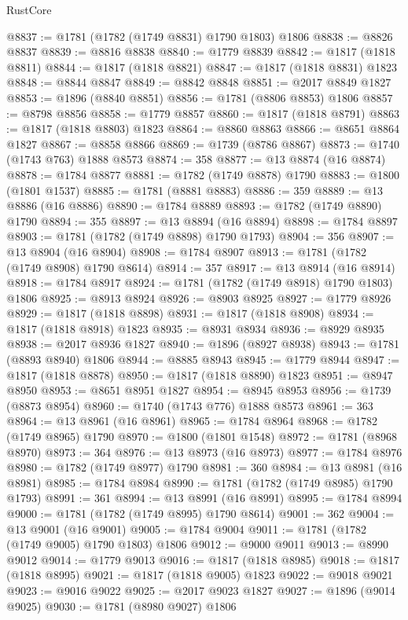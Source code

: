 \begin{lexlean}{RustCore}
\begin{coremodule}
@8837 := @1781 (@1782 (@1749 @8831) @1790 @1803) @1806
@8838 := @8826 @8837
@8839 := @8816 @8838
@8840 := @1779 @8839
@8842 := @1817 (@1818 @8811)
@8844 := @1817 (@1818 @8821)
@8847 := @1817 (@1818 @8831) @1823
@8848 := @8844 @8847
@8849 := @8842 @8848
@8851 := @2017 @8849 @1827
@8853 := @1896 (@8840 @8851)
@8856 := @1781 (@8806 @8853) @1806
@8857 := @8798 @8856
@8858 := @1779 @8857
@8860 := @1817 (@1818 @8791)
@8863 := @1817 (@1818 @8803) @1823
@8864 := @8860 @8863
@8866 := @8651 @8864 @1827
@8867 := @8858 @8866
@8869 := @1739 (@8786 @8867)
@8873 := @1740 (@1743 @763) @1888 @8573
@8874 := 358
@8877 := @13 @8874 (@16 @8874)
@8878 := @1784 @8877
@8881 := @1782 (@1749 @8878) @1790
@8883 := @1800 (@1801 @1537)
@8885 := @1781 (@8881 @8883)
@8886 := 359
@8889 := @13 @8886 (@16 @8886)
@8890 := @1784 @8889
@8893 := @1782 (@1749 @8890) @1790
@8894 := 355
@8897 := @13 @8894 (@16 @8894)
@8898 := @1784 @8897
@8903 := @1781 (@1782 (@1749 @8898) @1790 @1793)
@8904 := 356
@8907 := @13 @8904 (@16 @8904)
@8908 := @1784 @8907
@8913 := @1781 (@1782 (@1749 @8908) @1790 @8614)
@8914 := 357
@8917 := @13 @8914 (@16 @8914)
@8918 := @1784 @8917
@8924 := @1781 (@1782 (@1749 @8918) @1790 @1803) @1806
@8925 := @8913 @8924
@8926 := @8903 @8925
@8927 := @1779 @8926
@8929 := @1817 (@1818 @8898)
@8931 := @1817 (@1818 @8908)
@8934 := @1817 (@1818 @8918) @1823
@8935 := @8931 @8934
@8936 := @8929 @8935
@8938 := @2017 @8936 @1827
@8940 := @1896 (@8927 @8938)
@8943 := @1781 (@8893 @8940) @1806
@8944 := @8885 @8943
@8945 := @1779 @8944
@8947 := @1817 (@1818 @8878)
@8950 := @1817 (@1818 @8890) @1823
@8951 := @8947 @8950
@8953 := @8651 @8951 @1827
@8954 := @8945 @8953
@8956 := @1739 (@8873 @8954)
@8960 := @1740 (@1743 @776) @1888 @8573
@8961 := 363
@8964 := @13 @8961 (@16 @8961)
@8965 := @1784 @8964
@8968 := @1782 (@1749 @8965) @1790
@8970 := @1800 (@1801 @1548)
@8972 := @1781 (@8968 @8970)
@8973 := 364
@8976 := @13 @8973 (@16 @8973)
@8977 := @1784 @8976
@8980 := @1782 (@1749 @8977) @1790
@8981 := 360
@8984 := @13 @8981 (@16 @8981)
@8985 := @1784 @8984
@8990 := @1781 (@1782 (@1749 @8985) @1790 @1793)
@8991 := 361
@8994 := @13 @8991 (@16 @8991)
@8995 := @1784 @8994
@9000 := @1781 (@1782 (@1749 @8995) @1790 @8614)
@9001 := 362
@9004 := @13 @9001 (@16 @9001)
@9005 := @1784 @9004
@9011 := @1781 (@1782 (@1749 @9005) @1790 @1803) @1806
@9012 := @9000 @9011
@9013 := @8990 @9012
@9014 := @1779 @9013
@9016 := @1817 (@1818 @8985)
@9018 := @1817 (@1818 @8995)
@9021 := @1817 (@1818 @9005) @1823
@9022 := @9018 @9021
@9023 := @9016 @9022
@9025 := @2017 @9023 @1827
@9027 := @1896 (@9014 @9025)
@9030 := @1781 (@8980 @9027) @1806

\end{coremodule}
\end{lexlean}
